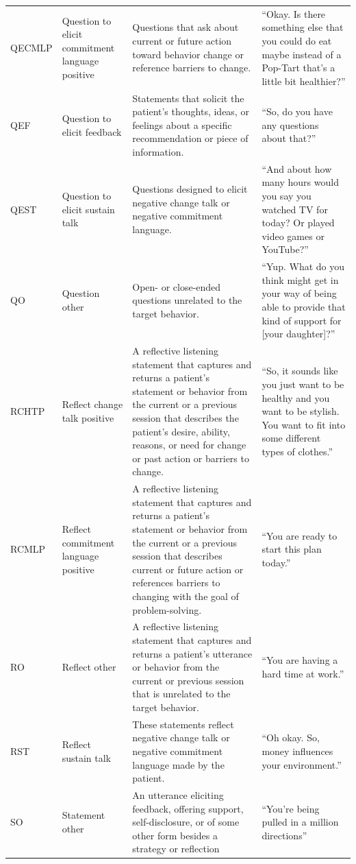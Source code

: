 \begin{small}
\begin{longtable}{p{1.3cm}p{2cm}p{5cm}p{4.8cm}}
QECMLP & Question to elicit commitment language positive & Questions that ask about current or future action toward behavior change or reference barriers to change. & ``Okay.  Is there something else that you could do eat maybe instead of a Pop-Tart that's a little bit healthier?''\\
QEF & Question to elicit feedback & Statements that solicit the patient's thoughts, ideas, or feelings about a specific recommendation or piece of information. & ``So, do you have any questions about that?''\\
QEST & Question to elicit sustain talk & Questions designed to elicit negative change talk or negative commitment language. & ``And about how many hours would you say you watched TV for today?  Or played video games or YouTube?''\\
QO & Question other & Open- or close-ended questions unrelated to the target behavior. & ``Yup. What do you think might get in your way of being able to provide that kind of support for [your daughter]?''\\
RCHTP & Reflect change talk positive & A reflective listening statement that captures and returns a patient's statement or behavior from the current or a previous session that describes the patient's desire, ability, reasons, or need for change or past action or barriers to change. & ``So, it sounds like you just want to be healthy and you want to be stylish. You want to fit into some different types of clothes.''\\
RCMLP & Reflect commitment language positive & A reflective listening statement that captures and returns a patient's statement or behavior from the current or a previous session that describes current or future action or references barriers to changing with the goal of problem-solving. & ``You are ready to start this plan today.''\\
RO & Reflect other & A reflective listening statement that captures and returns a patient's utterance or behavior from the current or previous session that is unrelated to the target behavior. & ``You are having a hard time at work.''\\
RST & Reflect sustain talk & These statements reflect negative change talk or negative commitment language made by the patient. & ``Oh okay.  So, money influences your environment.''\\
SO & Statement other & An utterance eliciting feedback, offering support, self-disclosure, or of some other form besides a strategy or reflection & ``You're being pulled in a million directions''\\

\end{longtable}
\end{small}
